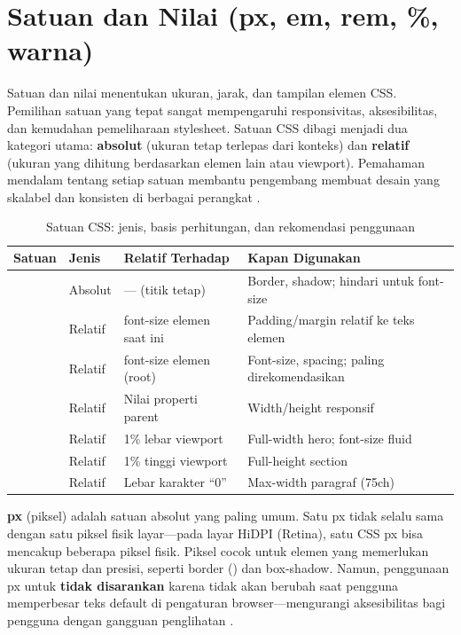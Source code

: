 \section{Satuan dan Nilai (px, em, rem, \%, warna)}

Satuan dan nilai menentukan ukuran, jarak, dan tampilan elemen CSS. Pemilihan satuan yang tepat sangat mempengaruhi responsivitas, aksesibilitas, dan kemudahan pemeliharaan stylesheet. Satuan CSS dibagi menjadi dua kategori utama: \textbf{absolut} (ukuran tetap terlepas dari konteks) dan \textbf{relatif} (ukuran yang dihitung berdasarkan elemen lain atau viewport). Pemahaman mendalam tentang setiap satuan membantu pengembang membuat desain yang skalabel dan konsisten di berbagai perangkat \cite{mdnCss}.

\begin{table}[htbp]
\centering
\begin{tabular}{|P{1.5cm}|P{1.5cm}|P{3.5cm}|P{5cm}|}
\hline
\textbf{Satuan} & \textbf{Jenis} & \textbf{Relatif Terhadap} & \textbf{Kapan Digunakan} \\
\hline
{} & Absolut & --- (titik tetap) & Border, shadow; hindari untuk font-size \\
\hline
{} & Relatif & font-size elemen saat ini & Padding/margin relatif ke teks elemen \\
\hline
{} & Relatif & font-size elemen  (root) & Font-size, spacing; paling direkomendasikan \\
\hline
\code{\%} & Relatif & Nilai properti parent & Width/height responsif \\
\hline
{} & Relatif & 1\% lebar viewport & Full-width hero; font-size fluid \\
\hline
{} & Relatif & 1\% tinggi viewport & Full-height section \\
\hline
{} & Relatif & Lebar karakter ``0'' & Max-width paragraf (75ch) \\
\hline
\end{tabular}
\caption{Satuan CSS: jenis, basis perhitungan, dan rekomendasi penggunaan}
\end{table}

\textbf{px} (piksel) adalah satuan absolut yang paling umum. Satu px tidak selalu sama dengan satu piksel fisik layar---pada layar HiDPI (Retina), satu CSS px bisa mencakup beberapa piksel fisik. Piksel cocok untuk elemen yang memerlukan ukuran tetap dan presisi, seperti border () dan box-shadow. Namun, penggunaan px untuk  \textbf{tidak disarankan} karena tidak akan berubah saat pengguna memperbesar teks default di pengaturan browser---mengurangi aksesibilitas bagi pengguna dengan gangguan penglihatan \cite{webdevCss}.

